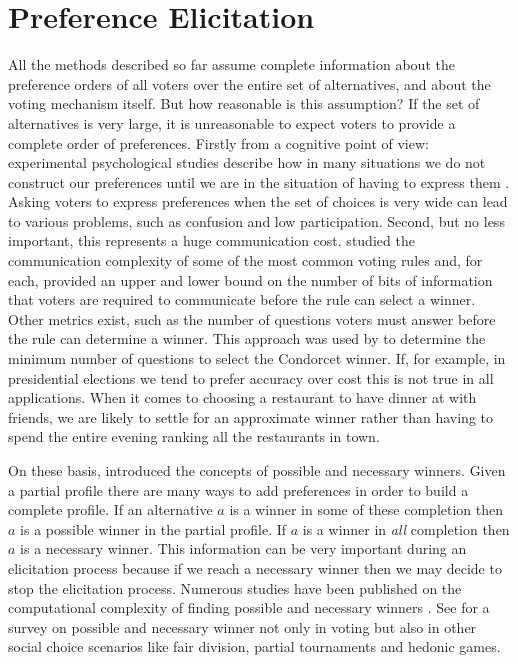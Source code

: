 \newpage
\section{Preference Elicitation}
\label{sec:litMNMX}

All the methods described so far assume complete information about the preference orders of all voters over the entire set of alternatives, and about the voting mechanism itself. But how reasonable is this assumption?
If the set of alternatives is very large, it is unreasonable to expect voters to provide a complete order of preferences. Firstly from a cognitive point of view: experimental psychological studies describe how in many situations we do not construct our preferences until we are in the situation of having to express them \citet{Lichtenstein2006}. Asking voters to express preferences when the set of choices is very wide can lead to various problems, such as confusion and low participation.
Second, but no less important, this represents a huge communication cost. \citet{Conitzer2005} studied the communication complexity of some of the most common voting rules and, for each, provided an upper and lower bound on the number of bits of information that voters are required to communicate before the rule can select a winner. Other metrics exist, such as the number of questions voters must answer before the rule can determine a winner. This approach was used by \citet{Procaccia2008} to determine the minimum number of questions to select the Condorcet winner.
If, for example, in presidential elections we tend to prefer accuracy over cost this is not true in all applications. When it comes to choosing a restaurant to have dinner at with friends, we are likely to settle for an approximate winner rather than having to spend the entire evening ranking all the restaurants in town.

On these basis, \citet{Konczak05} introduced the concepts of possible and necessary winners. Given a partial profile there are many ways to add preferences in order to build a complete profile. If an alternative $a$ is a winner in some of these completion then $a$ is a possible winner in the partial profile. If $a$ is a winner in \textit{all} completion then $a$ is a necessary winner. This information can be very important during an elicitation process because if we reach a necessary winner then we may decide to stop the elicitation process.
Numerous studies have been published on the computational complexity of finding possible and necessary winners \citep{Konczak05,Pini2007,Walsh2007,Xia2008,Xia2011,Baumeister2012}.
See \citet{Lang2020} for a survey on possible and necessary winner not only in voting but also in other social choice scenarios like fair division, partial tournaments and hedonic games.

